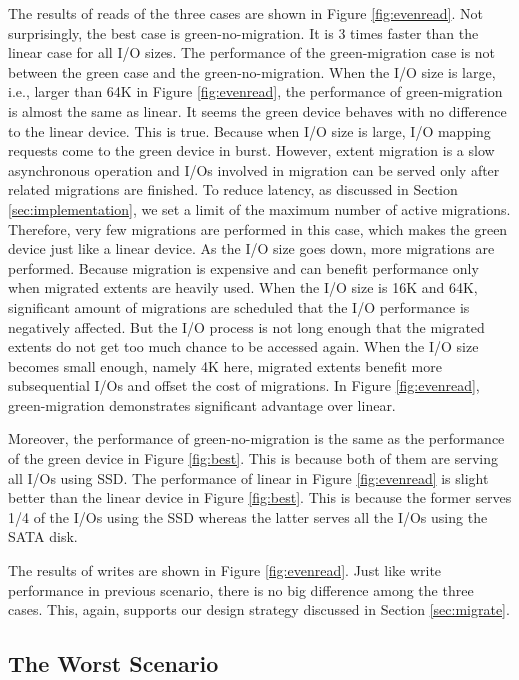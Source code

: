 The results of reads of the three cases are shown in Figure
\ref{fig:evenread}. Not surprisingly, the best case is
green-no-migration. It is 3 times faster than the linear case for all
I/O sizes. The performance of the green-migration case is not between
the green case and the green-no-migration. When the I/O size is large,
i.e., larger than 64K in Figure \ref{fig:evenread}, the performance of
green-migration is almost the same as linear. It seems the green
device behaves with no difference to the linear device. This is true.
Because when I/O size is large, I/O mapping requests come to the green
device in burst. However, extent migration is a slow asynchronous
operation and I/Os involved in migration can be served only after
related migrations are finished. To reduce latency, as discussed in
Section \ref{sec:implementation}, we set a limit of the maximum number
of active migrations. Therefore, very few migrations are performed in
this case, which makes the green device just like a linear device.  As
the I/O size goes down, more migrations are performed. Because
migration is expensive and can benefit performance only when migrated
extents are heavily used. When the I/O size is 16K and 64K,
significant amount of migrations are scheduled that the I/O
performance is negatively affected. But the I/O process is not long
enough that the migrated extents do not get too much chance to be
accessed again. When the I/O size becomes small enough, namely 4K
here, migrated extents benefit more subsequential I/Os and offset the
cost of migrations. In Figure \ref{fig:evenread}, green-migration
demonstrates significant advantage over linear.

Moreover, the performance of green-no-migration is the same as the
performance of the green device in Figure \ref{fig:best}. This is
because both of them are serving all I/Os using SSD. The performance
of linear in Figure \ref{fig:evenread} is slight better than the
linear device in Figure \ref{fig:best}. This is because the former
serves 1/4 of the I/Os using the SSD whereas the latter serves all the
I/Os using the SATA disk.

The results of writes are shown in Figure \ref{fig:evenread}. Just
like write performance in previous scenario, there is no big
difference among the three cases. This, again, supports our design
strategy discussed in Section \ref{sec:migrate}.

\subsection{The Worst Scenario}

